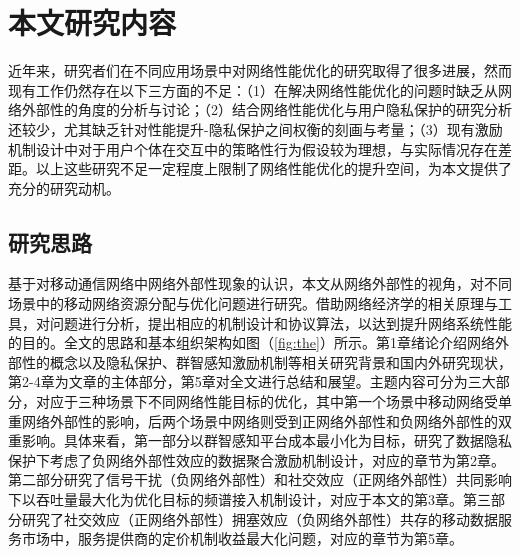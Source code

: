 \section{本文研究内容}

近年来，研究者们在不同应用场景中对网络性能优化的研究取得了很多进展，然而现有工作仍然存在以下三方面的不足：（1）在解决网络性能优化的问题时缺乏从网络外部性的角度的分析与讨论；（2）结合网络性能优化与用户隐私保护的研究分析还较少，尤其缺乏针对性能提升-隐私保护之间权衡的刻画与考量；（3）现有激励机制设计中对于用户个体在交互中的策略性行为假设较为理想，与实际情况存在差距。以上这些研究不足一定程度上限制了网络性能优化的提升空间，为本文提供了充分的研究动机。

\subsection{研究思路}

基于对移动通信网络中网络外部性现象的认识，本文从网络外部性的视角，对不同场景中的移动网络资源分配与优化问题进行研究。借助网络经济学的相关原理与工具，对问题进行分析，提出相应的机制设计和协议算法，以达到提升网络系统性能的目的。全文的思路和基本组织架构如图（\ref{fig:the}）所示。第1章绪论介绍网络外部性的概念以及隐私保护、群智感知激励机制等相关研究背景和国内外研究现状，第2-4章为文章的主体部分，第5章对全文进行总结和展望。主题内容可分为三大部分，对应于三种场景下不同网络性能目标的优化，其中第一个场景中移动网络受单重网络外部性的影响，后两个场景中网络则受到正网络外部性和负网络外部性的双重影响。具体来看，第一部分以群智感知平台成本最小化为目标，研究了数据隐私保护下考虑了{\kaishu 负网络外部性}效应的数据聚合激励机制设计，对应的章节为第2章。第二部分研究了信号干扰（{\kaishu 负网络外部性}）和社交效应（{\kaishu 正网络外部性}）共同影响下以吞吐量最大化为优化目标的频谱接入机制设计，对应于本文的第3章。第三部分研究了社交效应（{\kaishu 正网络外部性}）拥塞效应（{\kaishu 负网络外部性}）共存的移动数据服务市场中，服务提供商的定价机制收益最大化问题，对应的章节为第5章。


